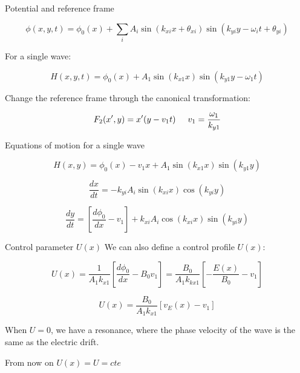 \documentclass[10pt]{beamer}
\begin{document}
\begin{frame}{Potential and reference frame}


\begin{equation}
\phi(x,y,t) = \phi_0(x) + \sum_i A_i \sin(k_{xi}x + \theta_{xi})\sin(k_{yi}y - \omega_i t + \theta_{yi})
\label{Potencial}
\end{equation}

For a single wave:

\begin{equation}
H(x,y,t) = \phi_0(x) + A_1 \sin(k_{x1}x)\sin(k_{y1}y - \omega_1 t)
\end{equation}

Change the reference frame through the canonical transformation:

\begin{equation}
F_2(x',y) = x'(y-v_1 t) \hspace{0.5cm} v_1 = \frac{\omega_1}{k_{y1}}
\end{equation}




\end{frame}


\begin{frame}{Equations of motion for a single wave}

\begin{equation}
H(x,y) = \phi_0(x) - v_1x + A_1 \sin(k_{x1}x)\sin(k_{y1}y)
\end{equation}

\begin{equation}
\frac{dx}{dt} = -k_{yi}A_i \sin(k_{xi}x)\cos(k_{yi}y)
\end{equation}

\begin{equation}
\frac{dy}{dt} =  \left[\frac{d\phi_0}{dx}  -  v_1\right] + k_{xi}A_i \cos(k_{xi}x)\sin(k_{yi}y)
\label{eqdy}
\end{equation}

\end{frame}


\begin{frame}{Control parameter $U(x)$}
    We can also define a control profile $U(x)$:

\begin{equation}
U(x) =  \frac{1}{A_1 k_{x1}} \left[ \frac{d\phi_0}{dx}  -  B_0v_1\right] = \frac{B_0}{A_1k_{kx1}} \left[ -\frac{E(x)}{B_0} - v_1  \right]
\label{eqU}
\end{equation}

\begin{equation}
    U(x) =  \frac{B_0}{A_1k_{x1}} \left[ v_E(x) - v_1  \right]
    \label{eqU2}
\end{equation}

When $U = 0$, we have a resonance, where the phase velocity of the wave is the same as the electric drift.

From now on $U(x) = U = cte$
\end{frame}
\end{document}
